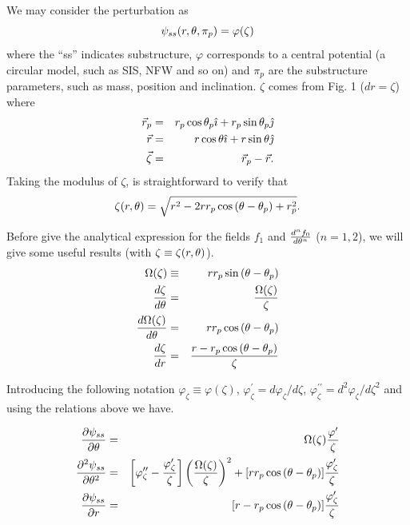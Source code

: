 We may consider the perturbation as
\begin{equation}
\psi_{ss}(r,\theta,\pi_p)=\varphi(\zeta)
\end{equation}
where the ``ss'' indicates substructure, $\varphi$ corresponds to a central potential (a circular model, such as SIS, NFW and so on) and $\pi_p$
are the substructure parameters, such as mass, position and inclination. $\zeta$ comes from Fig. 1 ($dr=\zeta$)
where
\begin{eqnarray}
\vec{r}_p&=&r_p\cos{\theta_p}\hat{\imath} + r_p\sin{\theta_p}\hat{\jmath}\\
\vec{r}&=&r\cos{\theta}\hat{\imath} + r\sin{\theta}\hat{\jmath}\\
\vec{\zeta}&=&\vec{r}_p-\vec{r}.
\end{eqnarray}
Taking the modulus of $\zeta$, is straightforward to verify that
\begin{equation}
\zeta(r,\theta)=\sqrt{r^2-2r r_p\cos{(\theta-\theta_p)}+r^2_p}.
\label{xirte}
\end{equation}

Before give the analytical expression for the fields $f_1$ and ${d^nf_0 \over d\theta^n}$ ($n=1,2$), we will
give some useful results (with $\zeta\equiv\zeta(r,\theta)$).
\begin{eqnarray}
\Omega(\zeta) & \equiv & r r_p \sin{(\theta-\theta_p)} \\
\dfrac{d\zeta}{d\theta}&=&  \dfrac{\Omega(\zeta)}{\zeta}\\
\dfrac{d\Omega(\zeta)}{d\theta}&=&r r_p\cos{(\theta-\theta_p)}\\
\dfrac{d\zeta}{dr}&=&\dfrac{r-r_p\cos{(\theta-\theta_p)}}{\zeta}
\end{eqnarray}

Introducing the following notation $\varphi_\zeta\equiv \varphi(\zeta) $, $\varphi^\prime_\zeta=d\varphi_\zeta/d\zeta$, $\varphi^{\prime\prime}_\zeta=d^2\varphi_\zeta/d\zeta^2$
and using the relations above we have.

\begin{eqnarray}
\dfrac{\prtl \psi_{ss}}{\prtl \te}&=&\Omega(\zeta)\dfrac{\varphi^\prime}{\zeta}\label{df0}\\
\dfrac{\prtl^2 \psi_{ss}}{\prtl\te^2}&=&\left[\varphi^{\prime\prime}_\zeta-\dfrac{\varphi^\prime_\zeta}{\zeta}\right]%
\left(\dfrac{\Omega(\zeta)}{\zeta}\right)^2+[r r_p\cos{(\te-\tep)}]\dfrac{\varphi^\prime_\zeta}{\zeta}\label{ddf0}\\
\dfrac{\prtl \psi_{ss}}{\prtl r}&=&[r-r_p\cos{(\te-\tep)}]\dfrac{\varphi^\prime_\zeta}{\zeta}\label{f1}
\end{eqnarray}

